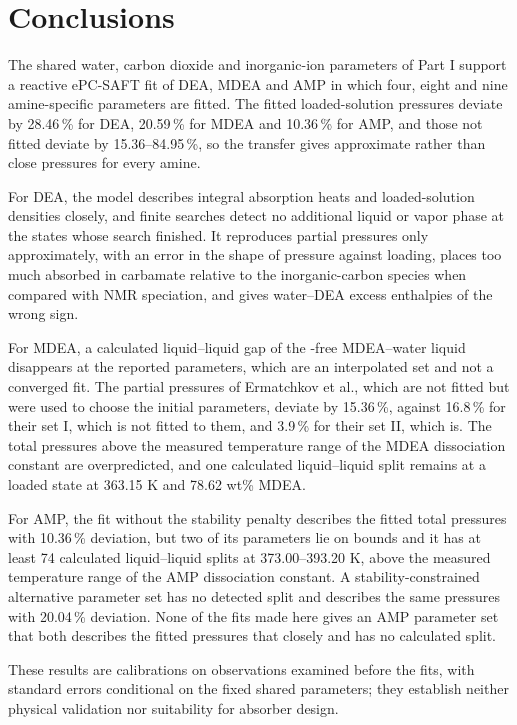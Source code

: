 \section{Conclusions}\label{sec:p2-conclusions}
The shared water, carbon dioxide and inorganic-ion parameters of Part I support a reactive ePC-SAFT fit of DEA, MDEA and AMP in which four, eight and nine amine-specific parameters are fitted.
The fitted loaded-solution pressures deviate by 28.46\,\% for DEA, 20.59\,\% for MDEA and 10.36\,\% for AMP, and those not fitted deviate by 15.36--84.95\,\%, so the transfer gives approximate rather than close pressures for every amine.

For DEA, the model describes integral absorption heats and loaded-solution densities closely, and finite searches detect no additional liquid or vapor phase at the states whose search finished.
It reproduces \COtwo partial pressures only approximately, with an error in the shape of pressure against loading, places too much absorbed \COtwo in carbamate relative to the inorganic-carbon species when compared with NMR speciation, and gives water--DEA excess enthalpies of the wrong sign.

For MDEA, a calculated liquid--liquid gap of the \COtwo-free MDEA--water liquid disappears at the reported parameters, which are an interpolated set and not a converged fit.
The \COtwo partial pressures of Ermatchkov et al., which are not fitted but were used to choose the initial parameters, deviate by 15.36\,\%, against 16.8\,\% for their set I, which is not fitted to them, and 3.9\,\% for their set II, which is.
The total pressures above the measured temperature range of the MDEA dissociation constant are overpredicted, and one calculated liquid--liquid split remains at a loaded state at 363.15 K and 78.62 wt\% MDEA.

For AMP, the fit without the stability penalty describes the fitted total pressures with 10.36\,\% deviation, but two of its parameters lie on bounds and it has at least 74 calculated liquid--liquid splits at 373.00--393.20 K, above the measured temperature range of the AMP dissociation constant.
A stability-constrained alternative parameter set has no detected split and describes the same pressures with 20.04\,\% deviation.
None of the fits made here gives an AMP parameter set that both describes the fitted pressures that closely and has no calculated split.

These results are calibrations on observations examined before the fits, with standard errors conditional on the fixed shared parameters; they establish neither physical validation nor suitability for absorber design.
